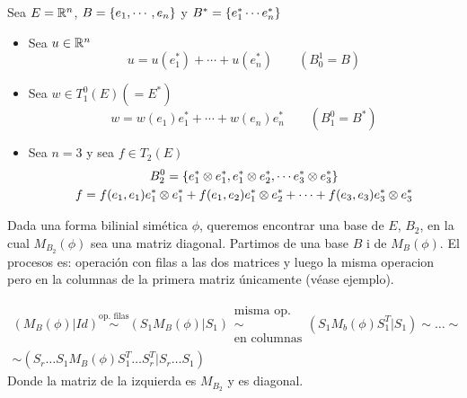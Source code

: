 \begin{example}
	Sea $E = \mathbb{R}^n$, $B = \{e_1, \cdots, e_n\}$ y
	$B^* = \{e_1^* \cdots e_n^*\}$
	\begin{itemize}
		\item Sea $u \in \mathbb{R}^n$
		\[
		u = u(e_1^*) + \cdots + u(e_n^*) \qquad (B_0^1 = B)
		\]
		\item Sea $w \in T_1^0(E) (= E^*)$
		\[
		w = w(e_1)e_1^* + \cdots + w(e_n)e_n^* \qquad (B_1^0 = B^*)
		\]
		\item Sea $n = 3$ y sea $f \in T_2(E)$
		\begin{gather*}
			B_2^0 = \{e_1^* \otimes e_1^*, e_1^* \otimes e_2^*,
				\cdots e_3^* \otimes e_3^*\} \\ f = f(e_1,e_1)e_1^*\otimes e_1^* +
			f(e_1,e_2)e_1^*\otimes e_2^* +\cdots + f(e_3,e_3)e_3^* \otimes e_3^*
		\end{gather*}
	\end{itemize}
\end{example}

\begin{thm}
	Dada una forma bilinial simética $\phi$, queremos encontrar una base de $E$, $B_2$, en la cual $M_{B_2}(\phi)$ sea una matriz diagonal. Partimos de una base $B$ i de $M_B(\phi)$. El procesos es: operación con filas a las dos matrices y luego la misma operacion pero en la columnas de la primera matriz únicamente (véase ejemplo).
	
	\begin{gather*}
		\left(M_B(\phi) \vert Id \right) \stackrel{\text{op. filas}}{\sim} \left( S_1M_B(\phi) \vert S_1 \right) \substack{\text{misma op.} \\ \sim \\ \text{en columnas}} \left( S_1 M_b(\phi)S_1^T \vert S_1 \right) \sim \dots \sim \\ \sim \left( S_r \dots S_1 M_B(\phi)S_1^T \dots S_r^T \vert S_r \dots S_1 \right)
	\end{gather*}
	Donde la matriz de la izquierda es $M_{B_2}$ y es diagonal.
	
	
\end{thm}

